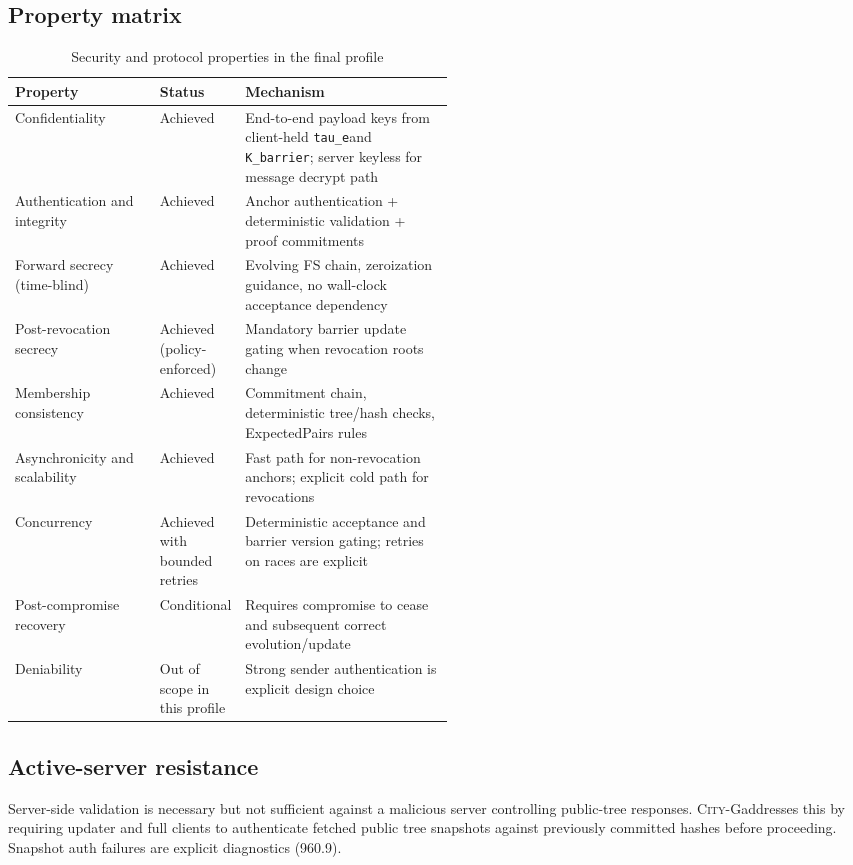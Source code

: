 \documentclass[11pt]{article}
\newcommand{\cityg}{\textsc{City-G}}
\newcommand{\kbarrier}{\texttt{K\_barrier}}
\newcommand{\tauE}{\texttt{tau\_e}}
\begin{document}
\subsection{Property matrix}
\begin{table}[t]
\centering
\caption{Security and protocol properties in the final profile}
\begin{tabularx}{\linewidth}{>{\raggedright\arraybackslash}p{0.33\linewidth} >{\raggedright\arraybackslash}p{0.18\linewidth} >{\raggedright\arraybackslash}X}
\toprule
Property & Status & Mechanism \\
\midrule
Confidentiality & Achieved & End-to-end payload keys from client-held \tauE and \kbarrier; server keyless for message decrypt path \\
Authentication and integrity & Achieved & Anchor authentication + deterministic validation + proof commitments \\
Forward secrecy (time-blind) & Achieved & Evolving FS chain, zeroization guidance, no wall-clock acceptance dependency \\
Post-revocation secrecy & Achieved (policy-enforced) & Mandatory barrier update gating when revocation roots change \\
Membership consistency & Achieved & Commitment chain, deterministic tree/hash checks, ExpectedPairs rules \\
Asynchronicity and scalability & Achieved & Fast path for non-revocation anchors; explicit cold path for revocations \\
Concurrency & Achieved with bounded retries & Deterministic acceptance and barrier version gating; retries on races are explicit \\
Post-compromise recovery & Conditional & Requires compromise to cease and subsequent correct evolution/update \\
Deniability & Out of scope in this profile & Strong sender authentication is explicit design choice \\
\bottomrule
\end{tabularx}
\end{table}

\subsection{Active-server resistance}
Server-side validation is necessary but not sufficient against a malicious server controlling public-tree responses. \cityg addresses this by requiring updater and full clients to authenticate fetched public tree snapshots against previously committed hashes before proceeding. Snapshot auth failures are explicit diagnostics (960.9).
\end{document}
